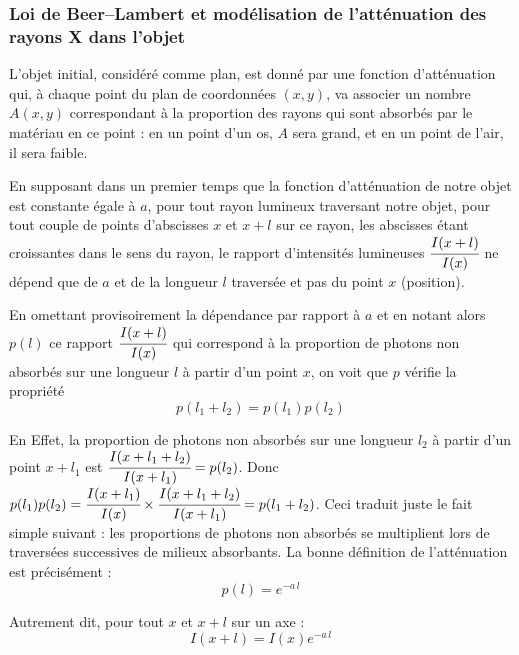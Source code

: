 \subsubsection{Loi de Beer--Lambert et modélisation de l'atténuation des rayons X dans l'objet}
L'objet initial, considéré comme plan, est donné par une fonction d'atténuation qui, à chaque point du plan de coordonnées $(x, y)$, va associer un nombre $A(x, y)$ correspondant à la proportion des rayons qui sont absorbés par le matériau en ce point  : en un point d'un os, $A$ sera grand, et en un point de l'air, il sera faible.

En supposant dans un premier temps que la fonction d'atténuation de notre objet est constante égale à $a$, pour tout rayon lumineux traversant notre objet, pour tout couple de points d'abscisses $x$ et $x+l$ sur ce rayon, les abscisses étant croissantes dans le sens du rayon, le rapport d'intensités lumineuses $\cfrac{I(x+l)}{I(x)}$ ne dépend que de $a$ et de la longueur $l$ traversée et pas du point $x$ (position).

En omettant provisoirement la dépendance par rapport à $a$ et en notant alors $p(l)$ ce rapport $\cfrac{I(x+l)}{I(x)}$ qui correspond à la proportion de photons non
absorbés sur une longueur $l$ à partir d'un point $x$, on voit que $p$ vérifie la propriété 
\begin{equation}
    p(l_1+l_2) = p(l_1)p(l_2)
\end{equation} 

En Effet, la proportion de photons non absorbés sur une longueur $l_2$ à partir d'un point $x+l_1$ est $\cfrac{I(x+l_1+l_2)}{I(x+l_1)}=p(l_2)$. Donc $p(l_1)p(l_2)=\cfrac{I(x+l_1)}{I(x)} \times \cfrac{I(x+l_1+l_2)}{I(x+l_1)}=p(l_1+l_2)$. Ceci traduit juste le fait simple suivant  : les proportions de photons non
absorbés se multiplient lors de traversées successives de milieux absorbants. La bonne définition de l'atténuation est précisément : 
\begin{equation}
    p(l)=e^{-a\, l}
    \label{eq:init_loi_beer_lambert_attenuation}
\end{equation}

Autrement dit, pour tout $x$ et $x+l$ sur un axe  : 
\begin{equation}
    I(x+l)=I(x)e^{-a\, l}
    \label{eq:init_loi_beer_lambert}
\end{equation}

